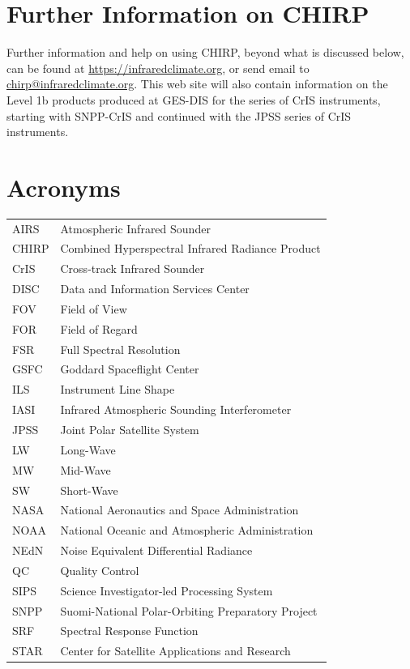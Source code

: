 \documentclass[11pt]{article}
\begin{document}
\section{Further Information on CHIRP}
Further information and help on using CHIRP, beyond what is discussed
below, can be found at
\href{https://infraredclimate.org}{https://infraredclimate.org}, or send
email to
\href{mailto:chirp@infraredclimate.org}{chirp@infraredclimate.org}.  This
web site will also contain information on the Level 1b products produced at
GES-DIS for the series of CrIS instruments, starting with SNPP-CrIS and
continued with the JPSS series of CrIS instruments.




\appendix
\section{Acronyms}

\begin{center}
\begin{tabular}{ m{2cm} m{10cm} }
AIRS    & Atmospheric Infrared Sounder \\
CHIRP   & Combined Hyperspectral Infrared Radiance Product \\
CrIS    & Cross-track Infrared Sounder \\
DISC    & Data and Information Services Center \\
FOV     & Field of View \\
FOR     & Field of Regard \\
FSR     & Full Spectral Resolution \\
GSFC    & Goddard Spaceflight Center \\
ILS     & Instrument Line Shape \\
IASI    & Infrared Atmospheric Sounding Interferometer \\
JPSS    & Joint Polar Satellite System \\
LW      & Long-Wave \\
MW      & Mid-Wave \\
SW      & Short-Wave \\
NASA    & National Aeronautics and Space Administration \\
NOAA    & National Oceanic and Atmospheric Administration \\
NEdN    & Noise Equivalent Differential Radiance \\
QC      & Quality Control \\
SIPS    & Science Investigator-led Processing System \\
SNPP    & Suomi-National Polar-Orbiting Preparatory Project \\
SRF     & Spectral Response Function \\
STAR    & Center for Satellite Applications and Research \\
\end{tabular}
\end{center}
\end{document}
